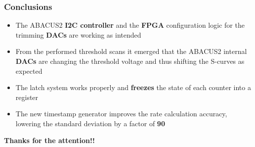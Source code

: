 \documentclass[aspectratio=169]{beamer}
\begin{document}
	\begin{frame}
	\frametitle{Conclusions}
		\begin{itemize}
			\item The ABACUS2 \textbf{I2C controller} and the \textbf{FPGA} configuration
			logic for the trimming \textbf{DACs} are working as intended
			\item From the performed threshold scans it emerged that the ABACUS2
			internal \textbf{DACs} are changing the threshold voltage and thus
			shifting the S-curves as expected
			\item The latch system works properly and \textbf{freezes} the state
			of each counter into a register
			\item The new timestamp generator improves the rate
			calculation accuracy, lowering the standard deviation by a factor of \textbf{90}
		\end{itemize}
			\vspace{0.8 cm}
		\begin{center}
			\textbf{Thanks for the attention!!}
		\end{center}	
	\end{frame}
\end{document}
